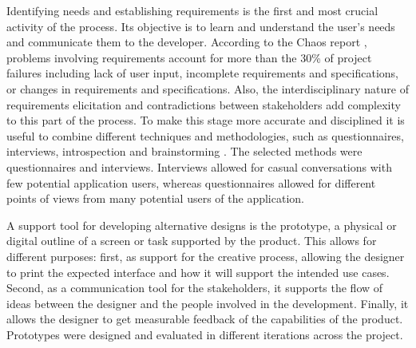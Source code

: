 Identifying needs and establishing requirements is the first and most crucial activity of the process. Its objective is to learn and understand the user's needs and communicate them to the developer. According to the Chaos report \cite{Group1994}, problems involving requirements account for more than the 30\% of project failures including lack of user input, incomplete requirements and specifications, or changes in requirements and specifications. Also, the interdisciplinary nature of requirements elicitation and contradictions between stakeholders add complexity to this part of the process. To make this stage more accurate and disciplined it is useful to combine different techniques and methodologies, such as questionnaires, interviews, introspection and brainstorming \cite{Coulin2005}. The selected methods were questionnaires and interviews. Interviews allowed for casual conversations with few potential application users, whereas questionnaires allowed for different points of views from many potential users of the application. 

A support tool for developing alternative designs is the prototype, a physical or digital outline of a screen or task supported by the product. This allows for different purposes: first, as support for the creative process, allowing the designer to print the expected interface and how it will support the intended use cases. Second, as a communication tool for the stakeholders, it supports the flow of ideas between the designer and the people involved in the development. Finally, it allows the designer to get measurable feedback of the capabilities of the product. Prototypes were designed and evaluated in different iterations across the project.